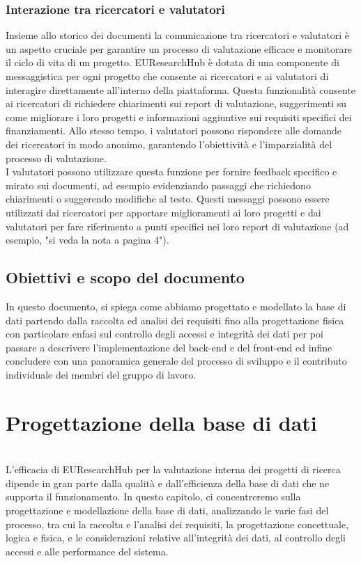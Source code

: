 \documentclass{report}
\begin{document}
\subsection{Interazione tra ricercatori e valutatori}
Insieme allo storico dei documenti la comunicazione tra ricercatori e valutatori è un aspetto cruciale per garantire un processo di valutazione efficace e monitorare il ciclo di vita di un progetto. EUResearchHub è dotata di una componente di messaggistica per ogni progetto che consente ai ricercatori e ai valutatori di interagire direttamente all'interno della piattaforma. Questa funzionalità consente ai ricercatori di richiedere chiarimenti sui report di valutazione, suggerimenti su come migliorare i loro progetti e informazioni aggiuntive sui requisiti specifici dei finanziamenti. Allo stesso tempo, i valutatori possono rispondere alle domande dei ricercatori in modo anonimo, garantendo l'obiettività e l'imparzialità del processo di valutazione.\\
I valutatori possono utilizzare questa funzione per fornire feedback specifico e mirato sui documenti, ad esempio evidenziando passaggi che richiedono chiarimenti o suggerendo modifiche al testo. Questi messaggi possono essere utilizzati dai ricercatori per apportare miglioramenti ai loro progetti e dai valutatori per fare riferimento a punti specifici nei loro report di valutazione (ad esempio, "si veda la nota a pagina 4").\\


\section{Obiettivi e scopo del documento}

In questo documento, si spiega come abbiamo progettato e modellato la base di dati partendo dalla raccolta ed analisi dei requisiti fino alla progettazione fisica con particolare enfasi sul controllo degli accessi e integrità dei dati per poi passare a descrivere l'implementazione del back-end e del front-end ed infine concludere con una panoramica generale del processo di sviluppo e il contributo individuale dei membri del gruppo di lavoro.\\


\chapter{Progettazione della base di dati}
\phantom{This text will be invisible}\\
L'efficacia di EUResearchHub per la valutazione interna dei progetti di ricerca dipende in gran parte dalla qualità e dall'efficienza della base di dati che ne supporta il funzionamento. In questo capitolo, ci concentreremo sulla progettazione e modellazione della base di dati, analizzando le varie fasi del processo, tra cui la raccolta e l'analisi dei requisiti, la progettazione concettuale, logica e fisica, e le considerazioni relative all'integrità dei dati, al controllo degli accessi e alle performance del sistema.
\end{document}
